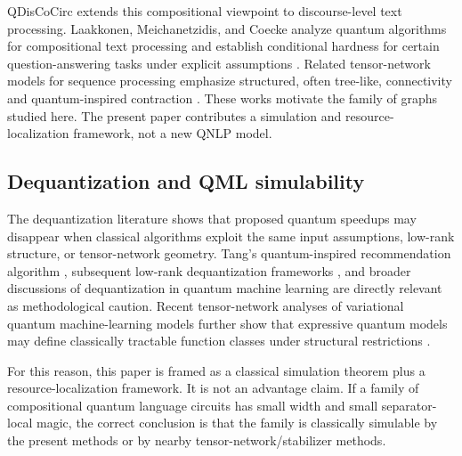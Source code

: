 QDisCoCirc extends this compositional viewpoint to discourse-level text processing. Laakkonen, Meichanetzidis, and Coecke analyze quantum algorithms for compositional text processing and establish conditional hardness for certain question-answering tasks under explicit assumptions \citep{LaakkonenMeichanetzidisCoecke2024}. Related tensor-network models for sequence processing emphasize structured, often tree-like, connectivity and quantum-inspired contraction \citep{HarveyYeungMeichanetzidis2025}. These works motivate the family of graphs studied here. The present paper contributes a simulation and resource-localization framework, not a new QNLP model.

\subsection{Dequantization and QML simulability}

The dequantization literature shows that proposed quantum speedups may disappear when classical algorithms exploit the same input assumptions, low-rank structure, or tensor-network geometry. Tang's quantum-inspired recommendation algorithm \citep{Tang2019}, subsequent low-rank dequantization frameworks \citep{ChiaEtAl2020}, and broader discussions of dequantization in quantum machine learning \citep{Tang2022} are directly relevant as methodological caution. Recent tensor-network analyses of variational quantum machine-learning models further show that expressive quantum models may define classically tractable function classes under structural restrictions \citep{ShinTeoJeong2024}.

For this reason, this paper is framed as a classical simulation theorem plus a resource-localization framework. It is not an advantage claim. If a family of compositional quantum language circuits has small width and small separator-local magic, the correct conclusion is that the family is classically simulable by the present methods or by nearby tensor-network/stabilizer methods.
